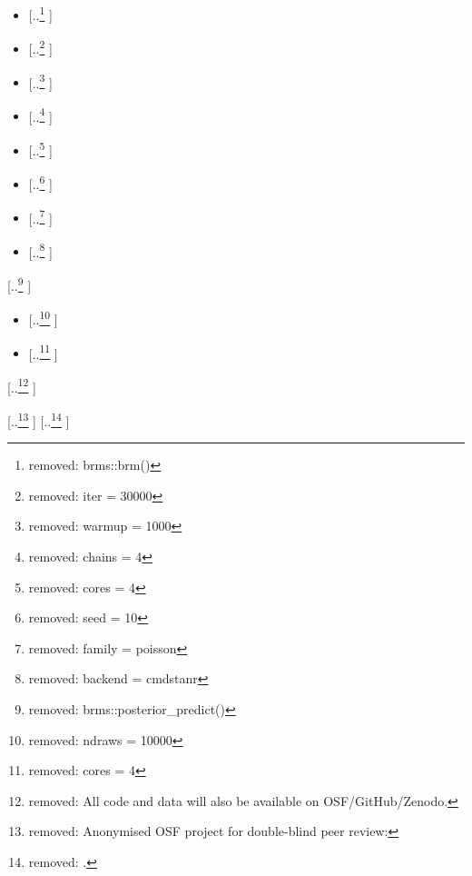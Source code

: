 \documentclass[unnumsec,webpdf,modern,medium]{oup-authoring-template}
\providecommand{\DIFdeltex}[1]{{\protect\color{red} [..\footnote{removed: #1} ]}} %
\providecommand{\DIFdel}[1]{\texorpdfstring{\DIFdeltex{#1}}{}} %
\begin{document}
\begin{itemize}%
\item%
\DIFdel{brms::brm()
    }%
\item%
\DIFdel{iter = 30000
    }%
\item%
\DIFdel{warmup = 1000
    }%
\item%
\DIFdel{chains = 4
    }%
\item%
\DIFdel{cores = 4
    }%
\item%
\DIFdel{seed = 10
    }%
\item%
\DIFdel{family = poisson
    }%
\item%
\DIFdel{backend = cmdstanr
    }
\end{itemize}%
\DIFdel{brms::posterior\_predict()
    }%
\begin{itemize}%
\item%
\DIFdel{ndraws = 10000
    }%
\item%
\DIFdel{cores = 4
    }
\end{itemize}%

\DIFdel{All code and data will also be available on OSF/GitHub/Zenodo.
}%

\DIFdel{Anonymised OSF project for double-blind peer review: }%
\DIFdel{.
}%
\end{document}
